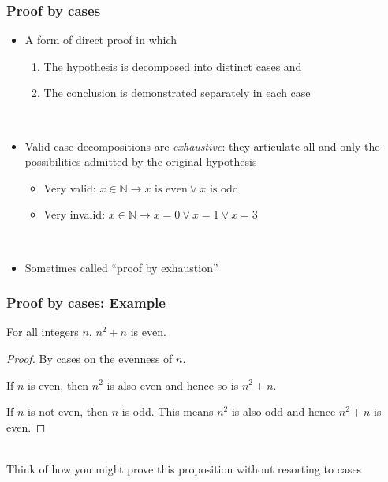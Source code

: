 \begin{frame}
  \frametitle{Proof by cases}
  \begin{itemize}
  \item A form of direct proof in which
    \begin{enumerate}
    \item The hypothesis is decomposed into distinct cases and
    \item The conclusion is demonstrated separately in each case
    \end{enumerate}
    \qquad\\
  \item Valid case decompositions are \textit{exhaustive}: they
    articulate all and only the possibilities admitted by the original
    hypothesis
    \begin{itemize}
    \item Very valid: $x\in\mathbb{N}\rightarrow x\text{ is even}\lor x\text{ is odd}$
    \item Very invalid: $x\in\mathbb{N}\rightarrow x=0\lor x=1\lor x=3$
    \end{itemize}
    \qquad\\    
  \item Sometimes called ``proof by exhaustion''
  \end{itemize}
\end{frame}


\begin{frame}
  \frametitle{Proof by cases: Example}
  \begin{prop}
    For all integers $n$, $n^2+n$ is even.
  \end{prop}
  \begin{proof}
    By cases on the evenness of $n$.

    If $n$ is even, then $n^2$ is also even and hence so is $n^2 +n$.

    If $n$ is not even, then $n$ is odd.  This means $n^2$ is also odd
    and hence $n^2 +n$ is even.
  \end{proof}
  \qquad\\
   Think of how you might prove this proposition without
  resorting to cases
\end{frame}


